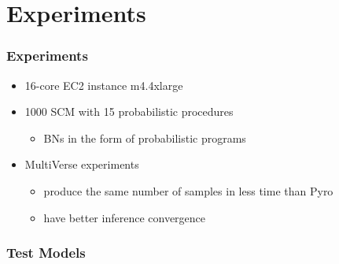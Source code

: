 \documentclass[usenames,dvipsnames]{beamer}
\begin{document}
\section{Experiments}\label{sec:experiments}
\begin{frame}
  \frametitle{Experiments}
  \begin{itemize}
    \item 16-core EC2 instance m4.4xlarge
    \item 1000 SCM with 15 probabilistic procedures
      \begin{itemize}
        \item BNs in the form of probabilistic programs
      \end{itemize}
    \item MultiVerse experiments
      \begin{itemize}
        \item produce the same number of samples in less time than Pyro
        \item have better inference convergence
      \end{itemize}
  \end{itemize}
\end{frame}
\begin{frame}
  \frametitle{Test Models}
  \begin{figure}[ht]
    
    \caption*{\label{fig:example-model}}
  \end{figure}
\end{frame}
\end{document}
